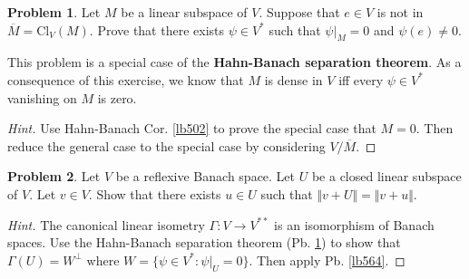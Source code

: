 \documentclass[12pt,b5paper,notitlepage]{article}
\theoremstyle{definition}
\newtheorem{prob}{\color{red}Problem}[section]
\theoremstyle{plain}
\newtheorem{pp}[df]{Proposition}
\newcommand{\wtd}{\widetilde}
\newcommand{\ovl}{\overline}
\newcommand{\Rbb}{\mathbb R}
\newcommand{\Ker}{\mathrm{Ker}}
\newcommand{\Fbb}{\mathbb F}
\newcommand{\Cl}{\mathrm{Cl}}
\newcommand{\eps}{\varepsilon}
\numberwithin{equation}{section}
\begin{document}

\begin{prob}\label{lb561}
Let $M$ be a linear subspace of $V$. Suppose that $e\in V$ is not in $\ovl M=\Cl_V(M)$. Prove that there exists $\psi\in V^*$ such that $\psi|_M=0$ and $\psi(e)\neq 0$. 
\end{prob}

This problem is a special case of the \textbf{Hahn-Banach separation theorem}.  As a consequence of this exercise, we know that $M$ is dense in $V$ iff every $\psi\in V^*$ vanishing on $M$ is zero.


\begin{comment}
As in the proof of Thm. \ref{lb499}, reduce to the case that $\Fbb=\Rbb$. By using Thm. \ref{lb499}, it suffices to find $\wtd\varphi\in \wtd M^*$ satisfying $\wtd\varphi|_M=0$ and $\wtd\varphi(e)=A\neq 0$, where $\wtd M=M+\Rbb e$. Check the proof of Lem. \ref{lb498} for the special case that $\varphi=0$. Use the fact that the LHS of \eqref{eq227} is $<0$ and the RHS of \eqref{eq227} is $>0$ to find $A$.
\end{comment}

\begin{proof}[Hint]
Use Hahn-Banach Cor. \ref{lb502} to prove the special case that $M=0$. Then reduce the general case to the special case by considering $V/\ovl M$.
\end{proof}

\begin{prob}\label{lb562}
Let $V$ be a reflexive Banach space. Let $U$ be a closed linear subspace of $V$. Let $v\in V$. Show that there exists $u\in U$ such that $\Vert v+U\Vert=\Vert v+u\Vert$. 
\end{prob}


\begin{proof}[Hint]
The canonical linear isometry $\Gamma:V\rightarrow V^{**}$ is an isomorphism of Banach spaces. Use the Hahn-Banach separation theorem (Pb. \ref{lb561}) to show that $\Gamma(U)=W^\perp$ where $W=\{\psi\in V^*:\psi|_U=0\}$. Then apply Pb. \ref{lb564}.
\end{proof}


\begin{comment}
\begin{pp}\label{lb563}
Suppose that $V$ is reflexive. Then in Prop. \ref{lb546} the condition $\Vert v\Vert\leq M+\eps$ can be strengthened to $\Vert v\Vert\leq M$.
\end{pp}

\begin{proof}
This is immediate from the proof of Prop. \ref{lb546} (cf. Pb. \ref{lb547}) and Pb. \ref{lb562} (applied to $U=\Ker(\Phi)$).
\end{proof}

\end{comment}
\end{document}
